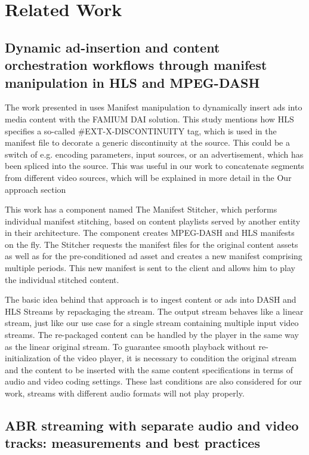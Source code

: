 \section{\textbf{Related Work }}\label{sec:relatedwork}

\subsection{Dynamic ad-insertion and content orchestration workflows through manifest manipulation in HLS and MPEG-DASH}

The work presented in \cite{adinsertion} uses Manifest manipulation to dynamically insert ads into media content with the FAMIUM DAI solution. This study mentions how HLS specifies a so-called \#EXT-X-DISCONTINUITY tag, which is used in the manifest file to decorate a generic discontinuity at the source. This could be a switch of e.g. encoding parameters, input sources, or an advertisement, which has been spliced into the source. This was useful in our work to concatenate segments from different video sources, which will be explained in more detail in the Our approach section

This work has a component named The Manifest Stitcher, which performs individual manifest stitching, based on content playlists served by another entity in their architecture. The component creates MPEG-DASH and HLS manifests on the fly. The Stitcher requests the manifest files for the original content assets as well as for the pre-conditioned ad asset and creates a new manifest comprising multiple periods. This new manifest is sent to the client and allows him to play the individual stitched content.

The basic idea behind that approach is to ingest content or ads into DASH and HLS Streams by repackaging the stream. The output stream behaves like a linear stream, just like our use case for a single stream containing multiple input video streams. The re-packaged content can be handled by the player in the same way as the linear original stream. To guarantee smooth playback without re-initialization of the video player, it is necessary to condition the original stream and the content to be inserted with the same content specifications in terms of audio and video coding settings. These last conditions are also considered for our work, streams with different audio formats will not play properly.
 
\subsection{ABR streaming with separate audio and video tracks: measurements and best practices}

